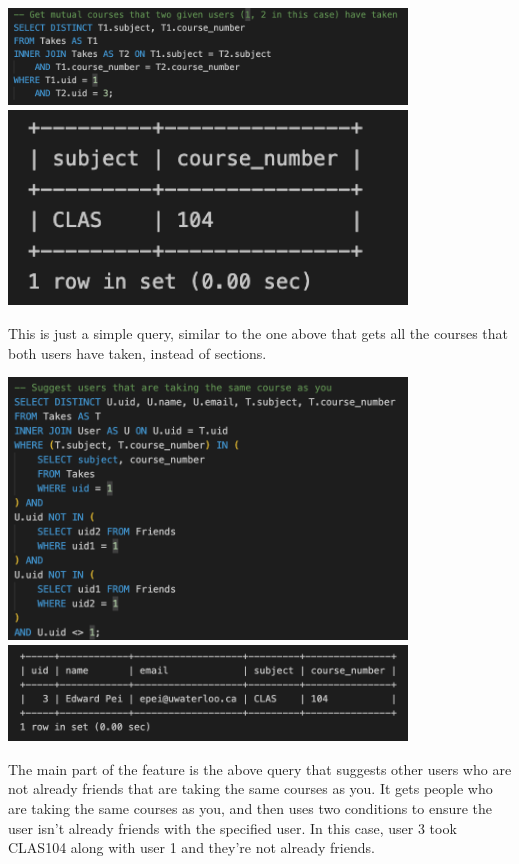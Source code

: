 \documentclass[12pt, a4paper]{article}
\begin{document}
\begin{center}
    \includegraphics[width=400px]{R9/q3}
    \includegraphics[width=400px]{R9/q3out}
\end{center}
This is just a simple query, similar to the one above that gets all the courses that both users have taken, instead of sections.
\begin{center}
    \includegraphics[width=400px]{R9/q4}
    \includegraphics[width=400px]{R9/q4out}
\end{center}
The main part of the feature is the above query that suggests other users who are not already friends that are taking the same courses as you. It gets people who are taking the same courses as you, and then uses two conditions to ensure the user isn't already friends with the specified user. In this case, user 3 took CLAS104 along with user 1 and they're not already friends.
\end{document}
